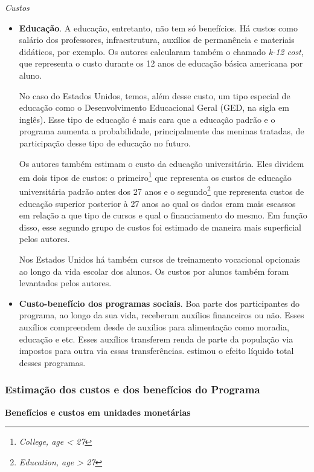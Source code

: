 \documentclass[12pt,letterpaper]{article}
\newcommand{\1}{\mathbbm{1}}
\numberwithin{equation}{section}
\begin{document}
\textit{Custos}

\begin{itemize}
    \item \textbf{Educação}. A educação, entretanto, não tem só benefícios. Há custos como salário dos professores, infraestrutura, auxílios de permanência e materiais didáticos, por exemplo. Os autores calcularam também o chamado \textit{k-12 cost}, que representa o custo durante os 12 anos de educação básica americana por aluno. 
    
    No caso do Estados Unidos, temos, além desse custo, um tipo especial de educação como o Desenvolvimento Educacional Geral (GED, na sigla em inglês). Esse tipo de educação é mais cara que a educação padrão e o programa aumenta a probabilidade, principalmente das meninas tratadas, de participação desse tipo de educação no futuro. 

    Os autores também estimam o custo da educação universitária. Eles dividem em dois tipos de custos: o primeiro\footnote{\textit{College, age < 27} } que representa os custos de educação universitária padrão antes dos 27 anos e o segundo\footnote{\textit{Education, age > 27}} que representa custos de educação superior posterior à 27 anos ao qual os dados eram mais escassos em relação a que tipo de cursos e qual o financiamento do mesmo. Em função disso, esse segundo grupo de custos foi estimado de maneira mais superficial pelos autores.
    
    Nos Estados Unidos há também cursos de treinamento vocacional opcionais ao longo da vida escolar dos alunos. Os custos por alunos também foram levantados pelos autores.

    \item \textbf{Custo-benefício dos programas sociais}. Boa parte dos participantes do programa, ao longo da sua vida, receberam auxílios financeiros ou não. Esses auxílios compreendem desde de auxílios para alimentação como moradia, educação e etc. Esses auxílios transferem renda de parte da população  via impostos para outra via essas transferências. \cite{heckman2010rate} estimou o efeito líquido total desses programas. 
    
\end{itemize}

\subsubsection{Estimação dos custos e dos benefícios do Programa}

{\large \textbf{Benefícios e custos em unidades monetárias}}
\end{document}
